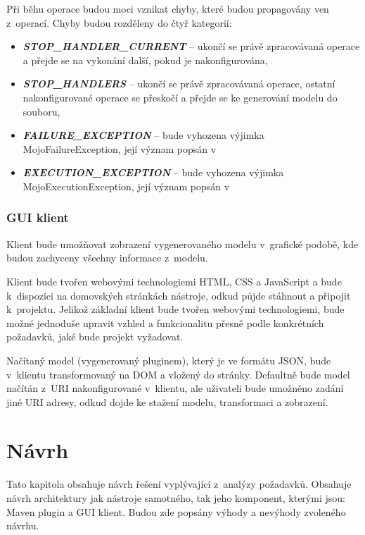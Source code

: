\documentclass[11pt,twoside,a4paper]{book}
\begin{document}
Při běhu operace budou moci vznikat chyby, které budou propagovány ven z~operací. Chyby
budou rozděleny do čtyř kategorií:

\begin{itemize}
  \item \textbf{\textit{STOP\_HANDLER\_CURRENT}} – ukončí se právě zpracovávaná operace a přejde
  se na vykonání další, pokud je nakonfigurována,
  \item \textbf{\textit{STOP\_HANDLERS}} – ukončí se právě
  zpracovávaná operace, ostatní nakonfigurované operace se přeskočí a přejde se ke generování modelu do souboru,
  \item \textbf{\textit{FAILURE\_EXCEPTION}} – bude
  vyhozena výjimka MojoFailureException, její význam popsán v~\cite{Maven08}
  \item \textbf{\textit{EXECUTION\_EXCEPTION}} – bude
  vyhozena výjimka MojoExecutionException, její význam popsán v~\cite{Maven08}
\end{itemize}

\subsection{GUI klient}

Klient bude umožňovat zobrazení vygenerovaného modelu v~grafické podobě, kde budou
zachyceny všechny informace z~modelu.

Klient bude tvořen webovými technologiemi HTML, CSS a JavaScript a bude k~dispozici na
domovských stránkách nástroje, odkud půjde stáhnout a připojit k~projektu. Jelikož základní
klient bude tvořen webovými technologiemi, bude možné jednoduše upravit vzhled a
funkcionalitu přesně podle konkrétních požadavků, jaké bude projekt vyžadovat.

Načítaný model (vygenerovaný pluginem), který je ve formátu JSON, bude v~klientu
transformovaný na DOM a vložený do stránky. Defaultně bude model načítán z~URI
nakonfigurované v~klientu, ale uživateli bude umožněno zadání jiné URI adresy,
odkud dojde ke stažení modelu, transformaci a zobrazení.

\chapter{Návrh}

Tato kapitola obsahuje návrh řešení vyplývající z~analýzy požadavků. Obsahuje
návrh architektury jak nástroje samotného, tak jeho komponent, kterými jsou: Maven plugin a GUI
klient. Budou zde popsány výhody a nevýhody zvoleného návrhu.
\end{document}
